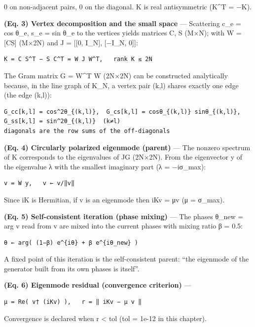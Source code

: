 \documentclass[
  a4paper,
]{ltjsarticle}
\begin{document}
0 on non-adjacent pairs, 0 on the diagonal. K is real antisymmetric
(K\^{}T = −K).

\textbf{(Eq. 3) Vertex decomposition and the small space} --- Scattering
c\_e = cos θ\_e, s\_e = sin θ\_e to the vertices yields matrices C, S
(M×N); with W = {[}C\textbar S{]} (M×2N) and J = {[}{[}0, I\_N{]},
{[}−I\_N, 0{]}{]}:

\begin{verbatim}
K = C S^T − S C^T = W J W^T,   rank K ≤ 2N
\end{verbatim}

The Gram matrix G = W\^{}T W (2N×2N) can be constructed analytically
because, in the line graph of K\_N, a vertex pair (k,l) shares exactly
one edge (the edge (k,l)):

\begin{verbatim}
G_cc[k,l] = cos^2θ_{(k,l)},  G_cs[k,l] = cosθ_{(k,l)} sinθ_{(k,l)},  G_ss[k,l] = sin^2θ_{(k,l)}  (k≠l)
diagonals are the row sums of the off-diagonals
\end{verbatim}

\textbf{(Eq. 4) Circularly polarized eigenmode (parent)} --- The nonzero
spectrum of K corresponds to the eigenvalues of JG (2N×2N). From the
eigenvector y of the eigenvalue λ with the smallest imaginary part (λ =
−iσ\_max):

\begin{verbatim}
v = W y,   v ← v/‖v‖
\end{verbatim}

Since iK is Hermitian, if v is an eigenmode then iKv = μv (μ = σ\_max).

\textbf{(Eq. 5) Self-consistent iteration (phase mixing)} --- The phases
θ\_new = arg v read from v are mixed into the current phases with mixing
ratio β = 0.5:

\begin{verbatim}
θ ← arg( (1−β) e^{iθ} + β e^{iθ_new} )
\end{verbatim}

A fixed point of this iteration is the self-consistent parent: ``the
eigenmode of the generator built from its own phases is itself''.

\textbf{(Eq. 6) Eigenmode residual (convergence criterion)} ---

\begin{verbatim}
μ = Re( v† (iKv) ),   r = ‖ iKv − μ v ‖
\end{verbatim}

Convergence is declared when r \textless{} tol (tol = 1e-12 in this
chapter).
\end{document}
